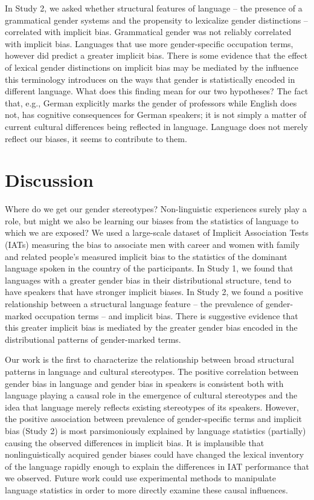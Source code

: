 \documentclass[9pt,twocolumn,twoside]{pnas-new}
\begin{document}
In Study 2, we asked whether structural features of language -- the
presence of a grammatical gender systems and the propensity to
lexicalize gender distinctions -- correlated with implicit bias.
Grammatical gender was not reliably correlated with implicit bias.
Languages that use more gender-specific occupation terms, however did
predict a greater implicit bias. There is some evidence that the effect
of lexical gender distinctions on implicit bias may be mediated by the
influence this terminology introduces on the ways that gender is
statistically encoded in different language. What does this finding mean
for our two hypotheses? The fact that, e.g., German explicitly marks the
gender of professors while English does not, has cognitive consequences
for German speakers; it is not simply a matter of current cultural
differences being reflected in language. Language does not merely
reflect our biases, it seems to contribute to them.

\section*{Discussion}\label{general-discussion}

Where do we get our gender stereotypes? Non-linguistic experiences surely play a role, but might we also be learning our biases from the statistics of language to which we are exposed? We used a large-scale dataset of Implicit Association Tests (IATs) measuring the bias to associate men with career and women with family and related people’s measured implicit bias to the statistics of the dominant language spoken in the country of the participants. In Study 1, we found that languages with a greater gender bias in their distributional structure, tend to have speakers that have stronger implicit biases. In Study 2, we found a positive relationship between a structural language feature – the prevalence of gender-marked occupation terms – and implicit bias. There is suggestive evidence that this greater implicit bias is mediated by the greater gender bias encoded in the distributional patterns of gender-marked terms.

Our work is the first to characterize the relationship between broad structural patterns in language and cultural stereotypes. The positive correlation between gender bias in language and gender bias in speakers is consistent both with language playing a causal role in the emergence of cultural stereotypes and the idea that language merely reflects existing stereotypes of its speakers. However, the positive association between prevalence of gender-specific terms and implicit bias (Study 2) is most parsimoniously explained by language statistics (partially) causing the observed differences in implicit bias. It is implausible that nonlinguistically acquired gender biases could have changed the lexical inventory of the language rapidly enough to explain the differences in IAT performance that we observed. Future work could use experimental methods to manipulate language statistics in order to more directly examine these causal influences.
\end{document}
